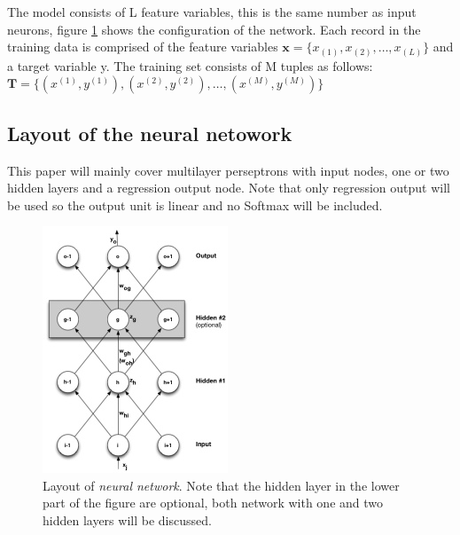 
%
%
%


The model consists of L feature variables, this is the same number as input neurons, figure  \ref{NeuralNet_InHidHidOut} shows the configuration of the network.
Each record in the training data is comprised of the feature variables $\textbf{x} =\{x_{(1)}, x_{(2)}, \ldots , x_{(L)}\}$
 and a target variable y. The training set consists of M tuples as follows: 
 $\textbf{T} =\{(x^{(1)}, y^{(1)}), (x^{(2)}, y^{(2)}), \ldots , (x^{(M)}, y^{(M)})\}$


\subsection{Layout of the neural netowork}
This paper will mainly cover multilayer perseptrons with input nodes, one or two hidden layers and a regression output node. Note that only regression output will be used so the output unit is linear and no Softmax will be included. 

\begin{figure}[h!] 
\begin{center}
\includegraphics{NeuralNet_InHidOut.jpg}
\caption{Layout of \textit{neural network}. Note that the hidden layer in the lower part of the figure are optional, both network with one and two hidden layers will be discussed.}
\label{NeuralNet_InHidHidOut}
\end{center}
\end{figure}

